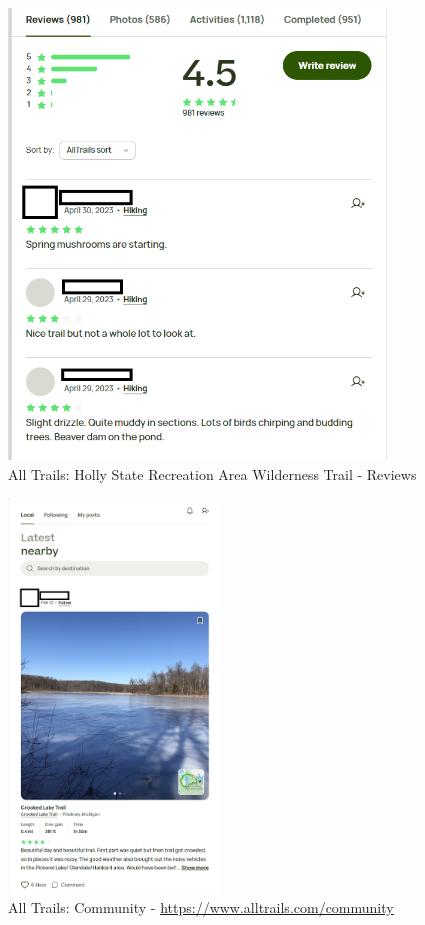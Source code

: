 \documentclass[12pt]{article}
\begin{document}
\begin{figure}[ht!]
    \centering
    \includegraphics[width=0.9\textwidth]{./AT_HSRAWT_Reviews.PNG}
    \caption{All Trails: Holly State Recreation Area Wilderness Trail - Reviews}
    \label{fig:AT_HSRAWT_Reviews}
\end{figure}

\begin{figure}[ht!]
    \centering
    \includegraphics[width=0.5\textwidth]{./AT_Community.PNG}
    \caption{All Trails: Community - \url{https://www.alltrails.com/community}}
    \label{fig:AT_Community}
\end{figure}
\end{document}
